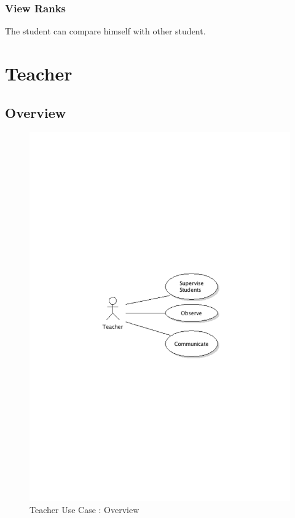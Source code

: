 		\subsubsection{View Ranks}
			The student can compare himself with other student.
\newpage
\section{Teacher}
	\subsection{Overview}
		\begin{figure}[ht]
			\begin{center}
				\includegraphics[width=\textwidth,  trim=2cm 11cm 2cm 12cm]{UML_figure/UC/teacher/UC_Teacher_General.pdf}
				\caption{Teacher Use Case : Overview}
			\end{center}
		\end{figure}
